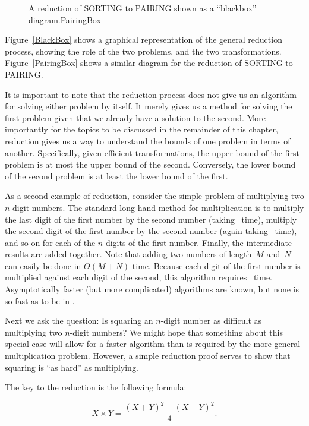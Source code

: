 \begin{figure}

{A reduction of SORTING to PAIRING shown as a ``blackbox''
diagram.}{PairingBox}
\end{figure}

Figure~\ref{BlackBox} shows a graphical representation of the
general reduction process, showing the role of the two problems, and
the two transformations.
Figure~\ref{PairingBox} shows a similar diagram for the reduction of
SORTING to PAIRING.

It is important to note that the reduction process does not give us
an algorithm for solving either problem by itself.
It merely gives us a method for solving the first problem given that
we already have a solution to the second.
More importantly for the topics to be discussed in the remainder of
this chapter, reduction gives us a way to understand the bounds of
one problem in terms of another.
Specifically, given efficient transformations,
the upper bound of the first problem is at most the upper bound of
the second.
Conversely, the lower bound of the second problem is at least the
lower bound of the first.

As a second example of reduction, consider the simple problem of
multiplying two \(n\)-digit numbers.
The standard long-hand method for multiplication is to multiply the
last digit of the first number by the second number
(taking \Thetan\ time), multiply the second digit of the first
number by the second number (again taking \Thetan\ time), and so on
for each of the \(n\) digits of the first number.
Finally, the intermediate results are added together.
Note that adding two numbers of length~\(M\) and~\(N\) can easily be done
in \(\Theta(M + N)\) time.
Because each digit of the first number is multiplied against each digit
of the second, this algorithm requires \Thetantwo\ time.
Asymptotically faster (but more complicated) algorithms are known, but
none is so fast as to be in \On.

Next we ask the question:
Is squaring an \(n\)-digit number as difficult as multiplying two
\(n\)-digit numbers?
We might hope that something about this special case will allow for a
faster algorithm than is required by the more general multiplication
problem.
However, a simple reduction proof serves to show that squaring is ``as
hard'' as multiplying.

The key to the reduction is the following formula:

\[X \times Y = \frac{(X + Y)^2 - (X - Y)^2}{4}.\]

